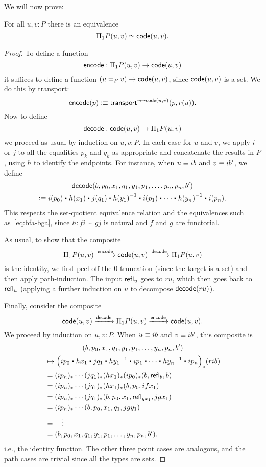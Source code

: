 We will now prove:
\begin{thm}\label{thm:naive-van-kampen}
  For all $u,v:P$ there is an equivalence
  \[ \Pi_1P(u,v) \simeq \mathsf{code}(u,v). \]
\end{thm}
\begin{proof}

To define a function
\[ \mathsf{encode} : \Pi_1P(u,v) \to \mathsf{code}(u,v) \]
it suffices to define a function $(u=_P v) \to \mathsf{code}(u,v) $,
since $\mathsf{code}(u,v)$ is a set.
We do this by transport:
\[\mathsf{encode}(p) \vcentcolon\equiv \mathsf{transport}^{v\mapsto \mathsf{code}(u,v)}(p,r(u)).\]
Now to define
\[ \mathsf{decode}: \mathsf{code}(u,v) \to \Pi_1P(u,v) \]
we proceed as usual by induction on $u,v:P$.
In each case for $u$ and $v$, we apply $i$ or $j$ to all the equalities $p_k$ and $q_k$ as appropriate and concatenate the results in $P$, using $h$ to identify the endpoints.
For instance, when $u\equiv ib$ and $v\equiv ib'$, we define
\begin{multline}\label{eq:decode}
 \decode(b, p_0, x_1, q_1, y_1, p_1, \dots, y_n, p_n, b')\\
 \defeq i(p_0)\ct h(x_1) \ct j(q_1) \ct \opp{h(y_1)} \ct i(p_1) \ct \cdots \ct \opp{h(y_n)}\ct i(p_n).
\end{multline}
This respects the set-quotient equivalence relation and the equivalences such as~\eqref{eq:bfa-bga}, since $h: fi \sim gj$ is natural and $f$ and $g$ are functorial.

As usual, to show that the composite
\[ \Pi_1P(u,v) \xrightarrow{\mathsf{encode}} \mathsf{code}(u,v) \xrightarrow{\mathsf{decode}} \Pi_1P(u,v) \]
is the identity, we first peel off the 0-truncation (since the target is a set) and then apply path-induction.
The input $\mathsf{refl}_{u}$ goes to $ru$, which then goes back to $\mathsf{refl}_{u}$ (applying a further induction on $u$ to decompose $\mathsf{decode}(ru)$).

Finally, consider the composite
\[  \mathsf{code}(u,v) \xrightarrow{\mathsf{decode}} \Pi_1P(u,v) \xrightarrow{\mathsf{encode}} \mathsf{code}(u,v). \]
We proceed by induction on $u,v:P$.
When $u\equiv ib$ and $v\equiv ib'$, this composite is
\begin{multline*}
(b, p_0, x_1, q_1, y_1, p_1, \dots, y_n, p_n, b')\\
\begin{split}
  &\mapsto \Big(ip_0\ct hx_1 \ct jq_1 \ct \opp{hy_1} \ct ip_1 \ct \cdots \ct \opp{hy_n}\ct ip_n\Big)_*(rib)\\
  &= (ip_n)_* \cdots(jq_1)_* (hx_1)_*(ip_0)_*(b,\refl{b},b)\\
  &= (ip_n)_* \cdots(jq_1)_* (hx_1)_*(b,p_0,ifx_1)\\
  &= (ip_n)_* \cdots(jq_1)_* (b,p_0,x_1,\refl{gx_1},jgx_1)\\
  &= (ip_n)_* \cdots (b,p_0,x_1,q_1,jgy_1)\\
  &= \quad\vdots\\
  &= (b, p_0, x_1, q_1, y_1, p_1, \dots, y_n, p_n, b').
\end{split}
\end{multline*}
i.e., the identity function.
The other three point cases are analogous, and the path cases are trivial since all the types are sets.
\end{proof}


